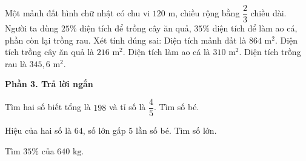 \begin{ex} %
Một mảnh đất hình chữ nhật có chu vi $120\text{ m}$, chiều rộng bằng $\dfrac{2}{3}$ chiều dài. Người ta dùng $25\%$ diện tích để trồng cây ăn quả, $35\%$ diện tích để làm ao cá, phần còn lại trồng rau. Xét tính đúng sai:
\choiceTF
{\True Diện tích mảnh đất là $864\text{ m}^2$.}
{\True Diện tích trồng cây ăn quả là $216\text{ m}^2$.}
{Diện tích làm ao cá là $310\text{ m}^2$.}
{\True Diện tích trồng rau là $345{,}6\text{ m}^2$.}
\end{ex}

\textbf{Phần 3. Trả lời ngắn}

\begin{ex} %
Tìm hai số biết tổng là $198$ và tỉ số là $\dfrac{4}{5}$. Tìm số bé.
\end{ex}

\begin{ex} %
Hiệu của hai số là $64$, số lớn gấp $5$ lần số bé. Tìm số lớn.
\end{ex}

\begin{ex} %
Tìm $35\%$ của $640\text{ kg}$.
\end{ex}

